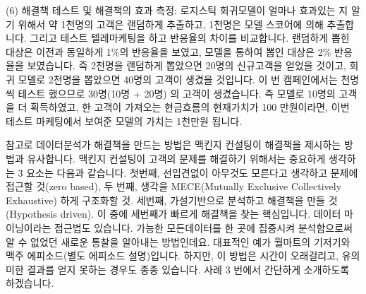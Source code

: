 \documentclass[letterpaper,10pt,english]{jupyterBook}
\begin{document}
\sphinxAtStartPar
(6) 해결책 테스트 및 해결책의 효과 측정: 로지스틱 회귀모델이 얼마나 효과있는 지 알기 위해서 약 1천명의 고객은 랜덤하게 추출하고, 1천명은 모델 스코어에 의해 추출합니다. 그리고 테스트 텔레마케팅을 하고 반응율의 차이를 비교합니다. 랜덤하게 뽑힌 대상은 이전과 동일하게 1\%의 반응율을 보였고, 모델을 통하여 뽑인 대상은 2\% 반응율을 보였습니다. 즉 2천명을 랜덤하게 뽑았으면 20명의 신규고객을 얻었을 것이고, 회귀 모델로 2천명을 뽑았으면 40명의 고객이 생겼을 것입니다. 이 번 캠페인에서는 천명씩 테스트 했으므로 30명(10명 + 20명) 의 고객이 생겼습니다. 즉 모델로 10명의 고객을 더 획득하였고, 한 고객이 가져오는 현금흐름의 현재가치가 100 만원이라면, 이번 테스트 마케팅에서 보여준 모델의 가치는 1천만원 됩니다.

\sphinxAtStartPar
참고로 데이터분석가 해결책을 만드는 방법은 맥킨지 컨설팅이 해결책을 제시하는 방법과 유사합니다. 맥킨지 컨설팅이 고객의 문제를 해결하기 위해서는 중요하게 생각하는 3 요소는 다음과 같습니다. 첫번째, 선입견없이 아무것도 모른다고 생각하고 문제에 접근할 것(zero based), 두 번째, 생각을 MECE(Mutually Exclusive Collectively Exhaustive) 하게 구조화할 것. 세번째, 가설기반으로 분석하고 해결책을 만들 것(Hypothesis driven). 이 중에 세번째가 빠르게 해결책을 찾는 핵심입니다. 데이터 마이닝이라는 접근법도 있습니다. 가능한 모든데이터를 한 곳에 집중시켜 분석함으로써 알 수 없었던 새로운 통찰을 알아내는 방법인데요. 대표적인 예가 월마트의 기저기와 맥주 에피소드(별도 에피소드 설명)입니다. 하지만, 이 방법은 시간이 오래걸리고, 유의미한 결과를 얻지 못하는 경우도 종종 있습니다. 사례 3 번에서 간단하게 소개하도록 하겠습니다.







\renewcommand{\indexname}{Index}
\printindex
\end{document}
